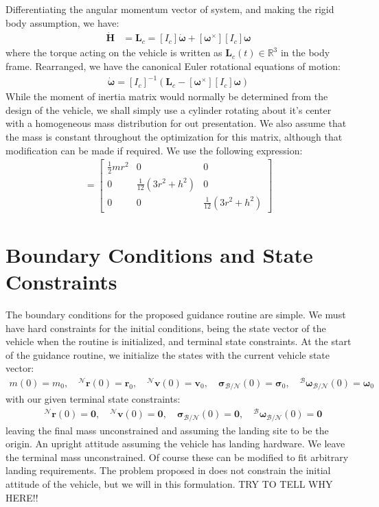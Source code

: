 Differentiating the angular momentum vector of system, and making the rigid body assumption, we have:
\begin{align}
\dot{\bm{H}} &= \mathbf{L}_c = [I_c]\dot{\boldsymbol{\omega}} + [\boldsymbol{\omega}^\times][I_c]\boldsymbol{\omega}
\end{align}
where the torque acting on the vehicle is written as $\mathbf{L}_c(t) \in \mathbb{R}^3$ in the body frame. Rearranged, we have the canonical Euler rotational equations of motion:
\begin{align}
	\dot{\boldsymbol{\omega}} = [I_c]^{-1}(\mathbf{L}_c - [\boldsymbol{\omega}^\times][I_c]\boldsymbol{\omega})
\end{align}
While the moment of inertia matrix would normally be determined from the design of the vehicle, we shall simply use a cylinder rotating about it's center with a homogeneous mass distribution for out presentation. We also assume that the mass is constant throughout the optimization for this matrix, although that modification can be made if required. We use the following expression:
\begin{align}
[I_c] = 
	\begin{bmatrix}
		\frac{1}{2} m r^{2} & 0 & 0 \\
		0 & \frac{1}{12}\left(3 r^{2}+h^{2}\right) & 0 \\
		0 & 0 & \frac{1}{12}\left(3 r^{2}+h^{2}\right)
	\end{bmatrix}
\end{align}




\section{Boundary Conditions and State Constraints}
The boundary conditions for the proposed guidance routine are simple. We must have hard constraints for the initial conditions, being the state vector of the vehicle when the routine is initialized, and terminal state constraints. At the start of the guidance routine, we initialize the states with the current vehicle state vector:
\begin{align}
	m(0) = m_0, \quad ^\mathcal{N}\mathbf{r}(0) = \mathbf{r}_0, \quad ^\mathcal{N}\mathbf{v}(0) = \mathbf{v}_0, \quad \boldsymbol{\sigma}_\mathcal{B/N}(0) = \boldsymbol{\sigma}_0, \quad  ^\mathcal{B}\boldsymbol{\omega}_\mathcal{B/N}(0) = \boldsymbol{\omega}_0
\end{align}
with our given terminal state constraints:
\begin{align}
	\quad ^\mathcal{N}\mathbf{r}(0) = \mathbf{0}, \quad ^\mathcal{N}\mathbf{v}(0) = \mathbf{0}, \quad \boldsymbol{\sigma}_\mathcal{B/N}(0) = \mathbf{0}, \quad  ^\mathcal{B}\boldsymbol{\omega}_\mathcal{B/N}(0) = \mathbf{0}
\end{align}
leaving the final mass unconstrained and assuming the landing site to be the origin. An upright attitude assuming the vehicle has landing hardware. We leave the terminal mass unconstrained. Of course these can be modified to fit arbitrary landing requirements. The problem proposed in \cite{szmuk2018successive} does not constrain the initial attitude of the vehicle, but we will in this formulation. TRY TO TELL WHY HERE!!


